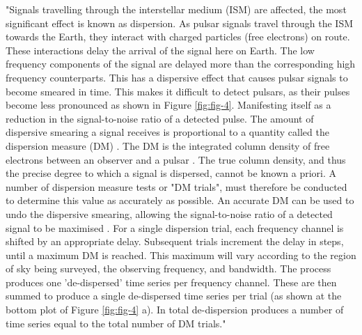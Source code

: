 "Signals travelling through the interstellar medium (ISM) are affected, the most significant effect is known as dispersion. As pulsar signals travel through the ISM towards the Earth, they interact with charged particles (free electrons) on route. These interactions delay the arrival of the signal here on Earth. The low frequency components of the signal are delayed more than the corresponding high frequency counterparts. This has a dispersive effect that causes pulsar signals to become smeared in time. This makes it difficult to detect pulsars, as their pulses become less pronounced as shown in Figure \ref{fig:fig-4}. Manifesting itself as a reduction in the signal-to-noise ratio of a detected pulse. The amount of dispersive smearing a signal receives is proportional to a quantity called the dispersion measure (DM) \citep{lorimer}. The DM is the integrated column density of free electrons between an observer and a pulsar \citep{lorimer2008}. The true column density, and thus the precise degree to which a signal is dispersed, cannot be known a priori. A number of dispersion measure tests or "DM trials", must therefore be conducted to determine this value as accurately as possible. An accurate DM can be used to undo the dispersive smearing, allowing the signal-to-noise ratio of a detected signal to be maximised \citep{lorimer}. For a single dispersion trial, each frequency channel is shifted by an appropriate delay. Subsequent trials increment the delay in steps, until a maximum DM is reached. This maximum will vary according to the region of sky being surveyed, the observing frequency, and bandwidth. The process produces one 'de-dispersed' time series per frequency channel. These are then summed to produce a single de-dispersed time series per trial (as shown at the bottom plot of Figure \ref{fig:fig-4} a). In total de-dispersion produces a number of time series equal to the total number of DM trials."
